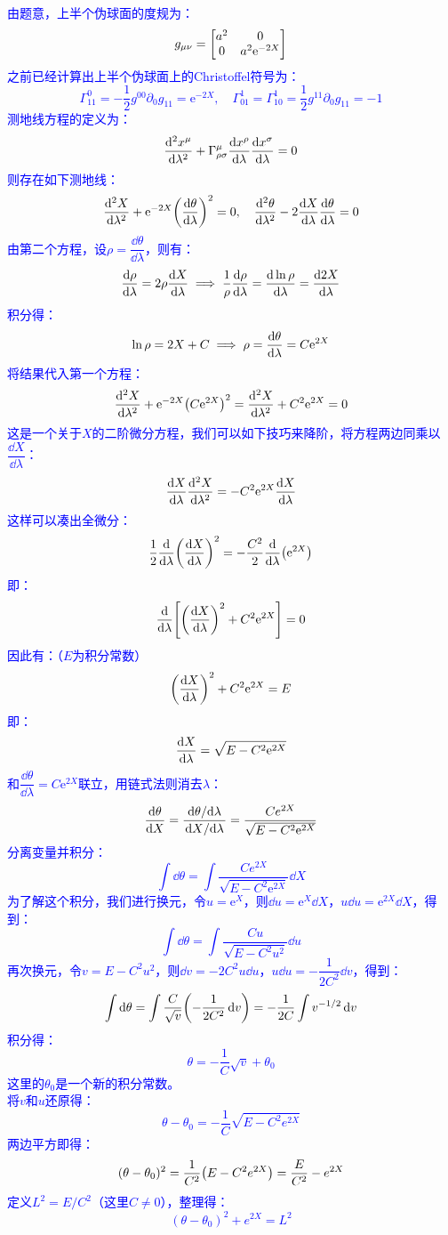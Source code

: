\documentclass[a4paper]{article}
\begin{document}
\begin{enumerate}
    \textcolor{blue}{
    由题意，上半个伪球面的度规为：
    \[
        g_{\mu\nu} = \mqty[a^2 & 0 \\ 0 & a^2 \mathrm{e}^{-2X}]
    \]
    之前已经计算出上半个伪球面上的Christoffel符号为：
    \[
        \Gamma^0_{11} = -\frac{1}{2} g^{00} \partial_0 g_{11} = \mathrm{e}^{-2X},\quad \Gamma^1_{01} = \Gamma^1_{10} = \frac{1}{2} g^{11} \partial_0 g_{11} = -1
    \]
    测地线方程的定义为：
    \[
        \dv[2]{x^\mu}{\lambda} + \Gamma^\mu_{\rho\sigma} \dv{x^\rho}{\lambda} \dv{x^\sigma}{\lambda} = 0
    \]
    则存在如下测地线：
    \[
        \dv[2]{X}{\lambda} + \mathrm{e}^{-2X} \qty(\dv{\theta}{\lambda})^2 = 0,\quad \dv[2]{\theta}{\lambda} - 2 \dv{X}{\lambda} \dv{\theta}{\lambda} = 0
    \]
    由第二个方程，设$\rho = \dfrac{\dd{\theta}}{\dd{\lambda}}$，则有：
    \[
        \dv{\rho}{\lambda} = 2\rho \dv{X}{\lambda} \implies \frac{1}{\rho} \dv{\rho}{\lambda} = \dv{\ln{\rho}}{\lambda} = \dv{2X}{\lambda}
    \]
    积分得：
    \[
        \ln{\rho} = 2X + C \implies \rho = \dv{\theta}{\lambda} = C \mathrm{e}^{2X}
    \]
    将结果代入第一个方程：
    \[
        \dv[2]{X}{\lambda} + \mathrm{e}^{-2X} \qty(C\mathrm{e}^{2X})^2 = \dv[2]{X}{\lambda} + C^2 \mathrm{e}^{2X} = 0
    \]
    这是一个关于$X$的二阶微分方程，我们可以如下技巧来降阶，将方程两边同乘以$\dfrac{\dd{X}}{\dd{\lambda}}$：
    \[
        \dv{X}{\lambda} \dv[2]{X}{\lambda} = -C^2 \mathrm{e}^{2X} \dv{X}{\lambda}
    \]
    这样可以凑出全微分：
    \[
        \frac{1}{2} \dv{\lambda}\qty(\dv{X}{\lambda})^2 = -\frac{C^2}{2} \dv{\lambda}(\mathrm{e}^{2X})
    \]
    即：
    \[
        \dv{\lambda}\qty[\qty(\dv{X}{\lambda})^2 + C^2 \mathrm{e}^{2X}] = 0
    \]
    因此有：（$E$为积分常数）
    \[
        \qty(\dv{X}{\lambda})^2 + C^2 \mathrm{e}^{2X} = E
    \]
    即：
    \[
        \dv{X}{\lambda} = \sqrt{E - C^2 \mathrm{e}^{2X}}
    \]
    和$\dfrac{\dd{\theta}}{\dd{\lambda}} = C \mathrm{e}^{2X}$联立，用链式法则消去$\lambda$：
    \[
        \dv{\theta}{X} = \frac{\dv*{\theta}{\lambda}}{\dv*{X}{\lambda}} = \frac{C e^{2X}}{\sqrt{E - C^2 \mathrm{e}^{2X}}}
    \]
    分离变量并积分：
    \[
        \int \dd{\theta} = \int \frac{C e^{2X}}{\sqrt{E - C^2 \mathrm{e}^{2X}}} \dd{X}
    \]
    为了解这个积分，我们进行换元，令$u = \mathrm{e}^X$，则$\dd{u} = \mathrm{e}^{X} \dd{X}$，$u\dd{u} = \mathrm{e}^{2X} \dd{X}$，得到：
    \[
        \int \dd{\theta} = \int \frac{Cu}{\sqrt{E - C^2 u^2}} \dd{u}
    \]
    再次换元，令$v = E - C^2 u^2$，则$\dd{v} = -2C^2 u \dd{u}$，$u \dd{u} = -\dfrac{1}{2C^2} \dd{v}$，得到：
    \[
        \int \dd{\theta} = \int \frac{C}{\sqrt{v}} \qty(-\frac{1}{2C^2} \dd{v}) = -\frac{1}{2C} \int v^{-1/2} \dd{v}
    \]
    积分得：
    \[
        \theta = -\frac{1}{C}\sqrt{v} + \theta_0
    \]
    这里的$\theta_0$是一个新的积分常数。 \\
    将$v$和$u$还原得：
    \[
        \theta - \theta_0 = -\frac{1}{C}\sqrt{E - C^2 e^{2X}}
    \]
    两边平方即得：
    \[
        (\theta - \theta_0)^2 = \frac{1}{C^2} \qty(E - C^2 e^{2X}) = \frac{E}{C^2} - e^{2X}
    \]
    定义$L^2 = E/C^2$（这里$C \neq 0$），整理得：
    \[
        (\theta - \theta_0)^2 + e^{2X} = L^2
    \]
    }


\end{enumerate}
\end{document}
